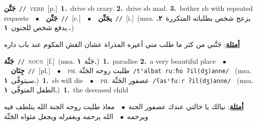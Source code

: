 \documentclass[10pt,a4paper,twoside]{article} %
\begin{document}
\begin{multicols}{2}
{\setlength\topsep{0pt}\textbf{\foreignlanguage{arabic}{جَنَّن}}\ {\color{gray}\texttt{//}\color{black}}\ \textsc{verb}\ [p.]\ \textbf{1.}~drive sb crazy.  \textbf{2.}~drive sb mad.  \textbf{3.}~bother sb with repeated requests\ \ $\bullet$\ \ \setlength\topsep{0pt}\textbf{\foreignlanguage{arabic}{جَنِّن}}\ {\color{gray}\texttt{//}\color{black}}\ [c.]\ \ $\bullet$\ \ \setlength\topsep{0pt}\textbf{\foreignlanguage{arabic}{يجَنِّن}}\ {\color{gray}\texttt{//}\color{black}}\ [i.]\ \color{gray}(msa. \foreignlanguage{arabic}{يزعج شخص بطلباته المتكررة}~\foreignlanguage{arabic}{\textbf{٢.}}  .\foreignlanguage{arabic}{يدفع شخص للجنون}~\foreignlanguage{arabic}{\textbf{١.}})\color{black}\  \begin{flushright}\color{gray}\foreignlanguage{arabic}{\textbf{\underline{\foreignlanguage{arabic}{أمثلة}}}: جَنَّني من كثر ما طلب مني أعيره المذراة عشان القش المكوم عند باب داره}\end{flushright}\color{black}} \vspace{2mm}

{\setlength\topsep{0pt}\textbf{\foreignlanguage{arabic}{جَنِّة}}\ {\color{gray}\texttt{//}\color{black}}\ \textsc{noun}\ [f.]\ \color{gray}(msa. \foreignlanguage{arabic}{جَنَّة}~\foreignlanguage{arabic}{\textbf{١.}})\color{black}\ \textbf{1.}~paradise  \textbf{2.}~a very beautiful place\ \ $\bullet$\ \ \setlength\topsep{0pt}\textbf{\foreignlanguage{arabic}{جِنَان}}\ {\color{gray}\texttt{//}\color{black}}\ [pl.]\ \ $\bullet$\ \ \textsc{ph.} \color{gray} \foreignlanguage{arabic}{طلبت روحه الجَنِّة}\color{black}\ {\color{gray}\texttt{/{\sffamily tˤalbat ruːħo ʔil(dʒ)anne}/}\color{black}}\ \color{gray} (msa. \foreignlanguage{arabic}{سيتوفَّى}~\foreignlanguage{arabic}{\textbf{١.}})\color{black}\ \textbf{1.}~sb will die\ \ $\bullet$\ \ \textsc{ph.} \color{gray} \foreignlanguage{arabic}{عصفور الجَنِّة}\color{black}\ {\color{gray}\texttt{/{\sffamily ʕasˤfuːr ʔil(dʒ)anne}/}\color{black}}\ \color{gray} (msa. \foreignlanguage{arabic}{الطفل المتوفَّى}~\foreignlanguage{arabic}{\textbf{١.}})\color{black}\ \textbf{1.}~the deceased child\  \begin{flushright}\color{gray}\foreignlanguage{arabic}{\textbf{\underline{\foreignlanguage{arabic}{أمثلة}}}: نيالك يا خالتي عندك عصفور الجنة\ $\bullet$\ \  معاذ طلبت روحه الجنة الله يتلطف فيه ويرحمه\ $\bullet$\ \  الله يرحمه ويغفرله ويجعل مثواه الجَنِّة}\end{flushright}\color{black}} \vspace{2mm}


\end{multicols}
\end{document}
